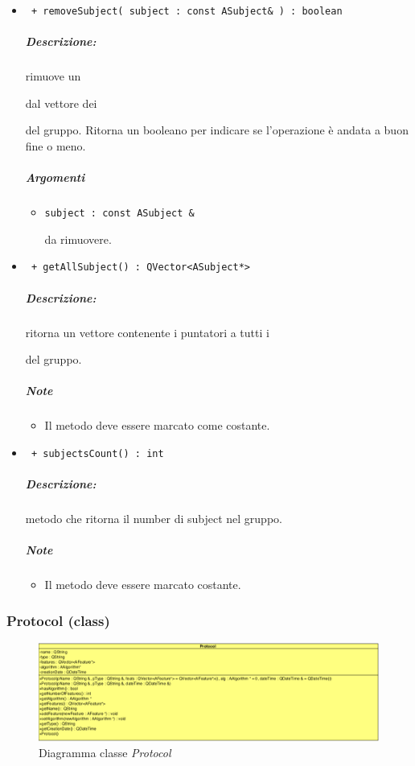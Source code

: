 \begin{itemize}
		\item \color{blue}\verb! + removeSubject( subject : const ASubject& ) : boolean !
		\color{black}
			\subparagraph{Descrizione:} rimuove un \subject{} dal vettore dei \subject{} del gruppo. Ritorna un booleano per indicare se l'operazione è andata a buon fine o meno.
			\subparagraph{Argomenti}
				\begin{itemize}
					\item \color{RoyalPurple}\verb!subject : const ASubject &! \\ 
					\color{black}\subject{} da rimuovere.
				\end{itemize}
			

		\item \color{blue}\verb! + getAllSubject() : QVector<ASubject*> !\\
		\color{black}
		\subparagraph{Descrizione:} ritorna un vettore contenente i puntatori a tutti i \subject{} del gruppo.
		\subparagraph{Note}
			\begin{itemize}
				\item Il metodo deve essere marcato come costante.
			\end{itemize}
			
		\item \color{blue}\verb! + subjectsCount() : int!\\
		\color{black}
		\subparagraph{Descrizione:} metodo che ritorna il number di subject nel gruppo.
		\subparagraph{Note}
			\begin{itemize}
				\item Il metodo deve essere marcato costante.
			\end{itemize}

	\end{itemize}
\pagebreak
\color{black}
\subsubsection{Protocol (class)}
\label{Protocol}
\begin{figure}[!h]
\centering
			\includegraphics[scale=0.6]{./Content/Immagini/modelCore/Protocol.png}
			\caption{Diagramma classe \textsl{Protocol}}
			\label{Protocol_img}
\end{figure}

